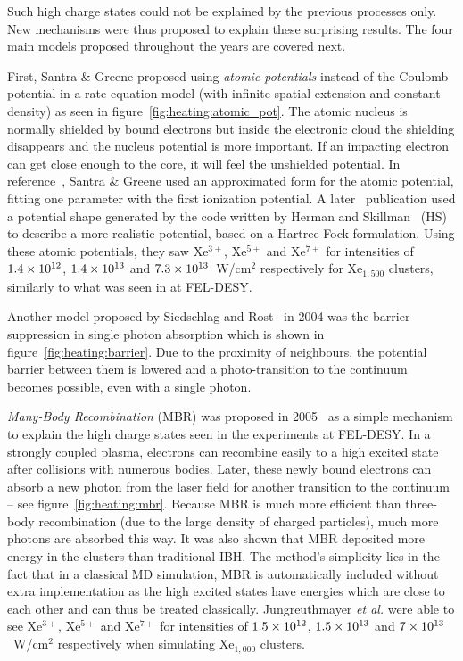 Such high charge states could not be explained by the previous processes only.
New mechanisms were thus proposed to explain these surprising results.
The four main models proposed throughout the years are covered next.



First, Santra \& Greene proposed using \textit{atomic potentials} instead of
the Coulomb potential in a rate equation model (with infinite spatial
extension and
constant density) as seen in figure~\ref{fig:heating:atomic_pot}.
The atomic nucleus is normally shielded by bound electrons but inside the
electronic cloud the shielding disappears and the nucleus potential is more
important. If an impacting electron can get close enough to the core, it will
feel the unshielded potential.
In reference~\cite{Greene2003}, Santra \& Greene used an approximated form for
the atomic potential, fitting one parameter with the first ionization potential.
A later~\cite{Walters2006} publication used a
potential shape generated by the code written by Herman and
Skillman~\cite{HS1963} (HS) to describe a more realistic
potential, based on a
Hartree-Fock formulation. Using these atomic potentials, they saw Xe$^{3+}$,
Xe$^{5+}$ and Xe$^{7+}$ for intensities of $\ten{1.4}{12}$, $\ten{1.4}{13}$ and
$\ten{7.3}{13}$~W/cm$^2$ respectively for Xe$_{1,500}$ clusters, similarly to
what was seen in at FEL-DESY.

\newpage
{}

Another model proposed by Siedschlag and Rost~\cite{Siedschlag2004} in 2004 was
the barrier suppression in single photon absorption which is shown in
figure~\ref{fig:heating:barrier}. Due to the proximity
of neighbours, the potential barrier between them is lowered and
a photo-transition to the continuum becomes possible, even with a single photon.



\textit{Many-Body Recombination} (MBR) was proposed in 2005~\cite{Jungreuthmayer2005}
as a simple mechanism to explain the high charge states seen in the
experiments at FEL-DESY. In a strongly coupled plasma, electrons can recombine
easily to a high excited
state after collisions with numerous bodies. Later, these newly bound electrons can
absorb a new photon from the laser field for another transition to the
continuum -- see figure~\ref{fig:heating:mbr}.
Because MBR is much more efficient than three-body
recombination (due to the large density of charged particles), much more
photons are absorbed this way. It was also shown that MBR deposited more energy
in the clusters than traditional IBH.
The method's simplicity
lies in the fact that in a classical MD simulation, MBR is automatically
included without extra implementation as the high excited states have energies
which are close to each other and can thus be treated classically.
Jungreuthmayer \textit{et al.} were able
to see Xe$^{3+}$, Xe$^{5+}$ and Xe$^{7+}$ for intensities of $\ten{1.5}{12}$,
$\ten{1.5}{13}$ and $\ten{7}{13}$~W/cm$^2$ respectively when simulating
Xe$_{1,000}$ clusters.

